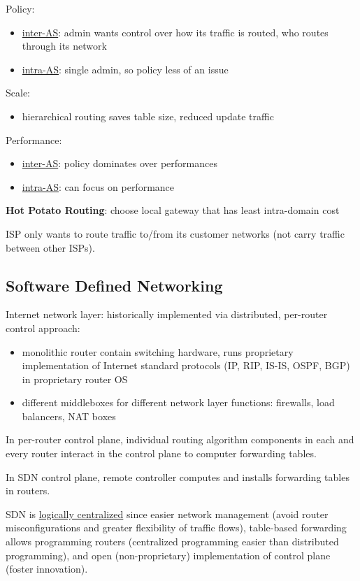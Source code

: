 \documentclass[11pt]{article}
\begin{document}
Policy:
\begin{itemize}
\item \uline{inter-AS}: admin wants control over how its traffic is routed, who routes through its network
\item \uline{intra-AS}: single admin, so policy less of an issue
\end{itemize}

Scale:
\begin{itemize}
\item hierarchical routing saves table size, reduced update traffic
\end{itemize}

Performance:
\begin{itemize}
\item \uline{inter-AS}: policy dominates over performances
\item \uline{intra-AS}: can focus on performance
\end{itemize}

\textbf{Hot Potato Routing}: choose local gateway that has least intra-domain cost

ISP only wants to route traffic to/from its customer networks (not carry traffic between other ISPs).
\subsection{Software Defined Networking}
\label{sec:orgc7e43d9}
Internet network layer: historically implemented via distributed, per-router control approach:
\begin{itemize}
\item monolithic router contain switching hardware, runs proprietary implementation of Internet standard
protocols (IP, RIP, IS-IS, OSPF, BGP) in proprietary router OS
\item different middleboxes for different network layer functions: firewalls, load balancers, NAT boxes
\end{itemize}

In per-router control plane, individual routing algorithm components in each and every router interact
in the control plane to computer forwarding tables.

In SDN control plane, remote controller computes and installs forwarding tables in routers.

SDN is \uline{logically centralized} since easier network management (avoid router misconfigurations and
greater flexibility of traffic flows), table-based forwarding allows programming routers (centralized
programming easier than distributed programming), and open (non-proprietary) implementation of
control plane (foster innovation).
\end{document}
